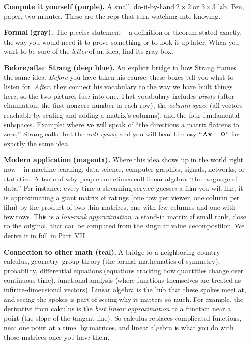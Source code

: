\begin{labbox}
\textbf{Compute it yourself (purple).} A small, do-it-by-hand $2\times2$ or
$3\times3$ lab. Pen, paper, two minutes. These are the reps that turn watching
into knowing.
\end{labbox}

\begin{formalbox}
\textbf{Formal (gray).} The precise statement -- a definition or theorem stated
exactly, the way you would need it to prove something or to look it up later.
When you want to be sure of the \emph{letter} of an idea, find its gray box.
\end{formalbox}

\begin{strangbox}
\textbf{Before/after Strang (deep blue).} An explicit bridge to how Strang frames
the same idea. \emph{Before} you have taken his course, these boxes tell you what
to listen for. \emph{After}, they connect his vocabulary to the way we have built
things here, so the two pictures fuse into one. That vocabulary includes
\emph{pivots} (after elimination, the first nonzero number in each row),
the \emph{column space} (all vectors reachable by scaling and adding a matrix's
columns), and the four fundamental subspaces. Example: where we will speak of ``the directions a
matrix flattens to zero,'' Strang calls that the \emph{null space}, and you will
hear him say ``$\mathbf{A}\mathbf{x}=\mathbf{0}$'' for exactly the same idea.
\end{strangbox}

\begin{applicationbox}
\textbf{Modern application (magenta).} Where this idea shows up in the world right
now -- in machine learning, data science, computer graphics, signals, networks,
or statistics. A taste of why people sometimes call linear algebra ``the language
of data.'' For instance: every time a streaming service guesses a film you will
like, it is approximating a giant matrix of ratings (one row per viewer, one
column per film) by the product of two thin matrices, one with few columns and
one with few rows. This is a \emph{low-rank approximation}: a stand-in matrix of
small rank, close to the original, that can be computed from the singular value
decomposition. We derive it in full in Part~VII.
\end{applicationbox}

\begin{connectionbox}
\textbf{Connection to other math (teal).} A bridge to a neighboring country:
calculus, geometry, group theory (the formal mathematics of symmetry), probability,
differential equations (equations tracking how quantities change over continuous
time), functional analysis (where functions themselves are treated as infinite-dimensional
vectors). Linear algebra is the hub that these spokes meet at, and seeing the
spokes is part of seeing why it matters so much. For example, the derivative
from calculus is the \emph{best linear approximation} to a function near a point
(the slope of the tangent line). So calculus replaces complicated functions,
near one point at a time, by matrices, and linear algebra is what you do with
those matrices once you have them.
\end{connectionbox}

